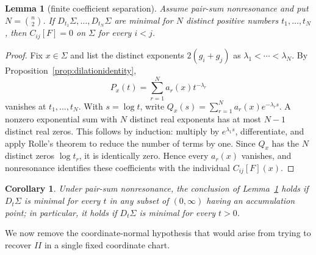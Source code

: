 \documentclass[preprint,12pt]{elsarticle}
\numberwithin{equation}{section}
\newtheorem{lemma}[theorem]{Lemma}
\newtheorem{corollary}[theorem]{Corollary}
\theoremstyle{definition}\newtheorem{definition}[theorem]{Definition}
\theoremstyle{remark}\newtheorem{remark}[theorem]{Remark}
\begin{document}
\begin{lemma}[finite coefficient separation]\label{lem:separation}
Assume pair-sum nonresonance and put $N=\binom n2$. If $D_{t_1}\Sigma,\ldots,D_{t_N}\Sigma$ are minimal for $N$ distinct positive numbers $t_1,\ldots,t_N$, then $C_{ij}[F]=0$ on $\Sigma$ for every $i<j$.
\end{lemma}
\begin{proof}
Fix $x\in\Sigma$ and list the distinct exponents $2(g_i+g_j)$ as $\lambda_1<\cdots<\lambda_N$. By Proposition~\ref{prop:dilationidentity},
\begin{equation}\label{eq:expsum}
P_x(t)=\sum_{r=1}^N a_r(x)t^{-\lambda_r}
\end{equation}
vanishes at $t_1,\ldots,t_N$. With $s=\log t$, write $Q_x(s)=\sum_{r=1}^Na_r(x)e^{-\lambda_rs}$. A nonzero exponential sum with $N$ distinct real exponents has at most $N-1$ distinct real zeros. This follows by induction: multiply by $e^{\lambda_1s}$, differentiate, and apply Rolle's theorem to reduce the number of terms by one. Since $Q_x$ has the $N$ distinct zeros $\log t_r$, it is identically zero. Hence every $a_r(x)$ vanishes, and nonresonance identifies these coefficients with the individual $C_{ij}[F](x)$.
\end{proof}

\begin{corollary}\label{cor:accumulation}
Under pair-sum nonresonance, the conclusion of Lemma~\ref{lem:separation} holds if $D_t\Sigma$ is minimal for every $t$ in any subset of $(0,\infty)$ having an accumulation point; in particular, it holds if $D_t\Sigma$ is minimal for every $t>0$.
\end{corollary}

We now remove the coordinate-normal hypothesis that would arise from trying to recover $II$ in a single fixed coordinate chart.
\end{document}
